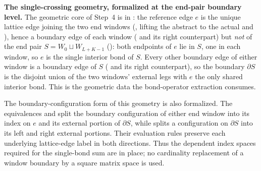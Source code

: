\documentclass{article}
\begin{document}
\medskip
\noindent\textbf{The single-crossing geometry, formalized at the end-pair
    boundary level.} The geometric core of Step~4 is in
: the reference edge $e$ is the
unique lattice edge joining the two end windows
(, lifting the abstract
 to the actual
 and ),
hence a boundary edge of each window
( and
its right counterpart) but \emph{not} of the end pair
$S = W_0 \sqcup W_{L+K-1}$
():
both endpoints of $e$ lie in $S$, one in each window, so $e$ is the single
interior bond of $S$. Every other boundary edge of either window is a boundary
edge of $S$
( and its right counterpart),
so the boundary $\partial S$ is the disjoint union of the two windows' external
legs with $e$ the only shared interior bond. This is the geometric data the
bond-operator extraction consumes.

The boundary-configuration form of this geometry is also formalized.  The
equivalences
 and
 split the boundary
configuration of either end window into its index on $e$ and its external
portion of $\partial S$, while
 splits a configuration
on $\partial S$ into its left and right external portions.  Their evaluation
rules preserve each underlying lattice-edge label in both directions.  Thus
the dependent index spaces required for the single-bond sum are in place; no
cardinality replacement of a window boundary by a square matrix space is used.
\end{document}
